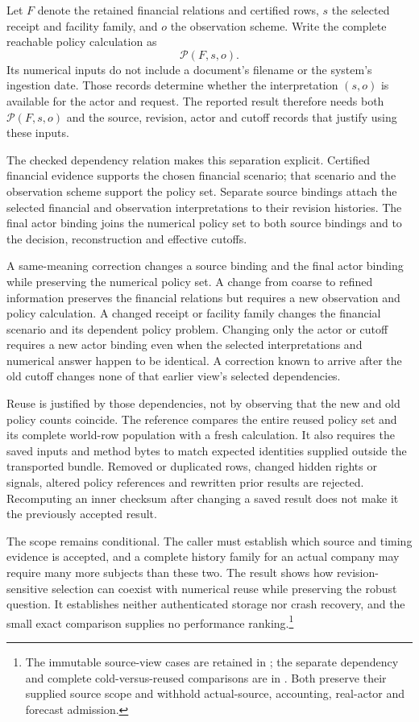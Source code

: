 Let $F$ denote the retained financial relations and certified rows, $s$ the selected receipt and facility family, and $o$ the observation scheme. Write the complete reachable policy calculation as
\begin{equation}
 \mathcal P(F,s,o).
 \label{eq:source-policy-dependency}
\end{equation}
Its numerical inputs do not include a document's filename or the system's ingestion date. Those records determine whether the interpretation $(s,o)$ is available for the actor and request. The reported result therefore needs both $\mathcal P(F,s,o)$ and the source, revision, actor and cutoff records that justify using these inputs.

The checked dependency relation makes this separation explicit. Certified financial evidence supports the chosen financial scenario; that scenario and the observation scheme support the policy set. Separate source bindings attach the selected financial and observation interpretations to their revision histories. The final actor binding joins the numerical policy set to both source bindings and to the decision, reconstruction and effective cutoffs.

A same-meaning correction changes a source binding and the final actor binding while preserving the numerical policy set. A change from coarse to refined information preserves the financial relations but requires a new observation and policy calculation. A changed receipt or facility family changes the financial scenario and its dependent policy problem. Changing only the actor or cutoff requires a new actor binding even when the selected interpretations and numerical answer happen to be identical. A correction known to arrive after the old cutoff changes none of that earlier view's selected dependencies.

Reuse is justified by those dependencies, not by observing that the new and old policy counts coincide. The reference compares the entire reused policy set and its complete world-row population with a fresh calculation. It also requires the saved inputs and method bytes to match expected identities supplied outside the transported bundle. Removed or duplicated rows, changed hidden rights or signals, altered policy references and rewritten prior results are rejected. Recomputing an inner checksum after changing a saved result does not make it the previously accepted result.

The scope remains conditional. The caller must establish which source and timing evidence is accepted, and a complete history family for an actual company may require many more subjects than these two. The result shows how revision-sensitive selection can coexist with numerical reuse while preserving the robust question. It establishes neither authenticated storage nor crash recovery, and the small exact comparison supplies no performance ranking.\footnote{The immutable source-view cases are retained in ; the separate dependency and complete cold-versus-reused comparisons are in . Both preserve their supplied source scope and withhold actual-source, accounting, real-actor and forecast admission.}
